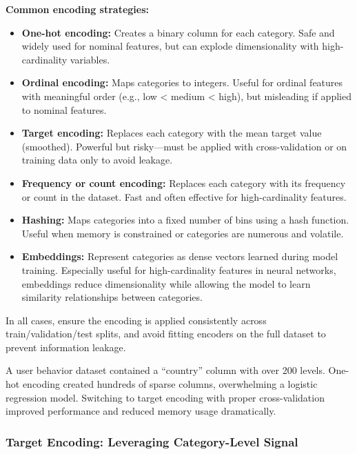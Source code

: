 \documentclass[12pt,openany, draft]{book}
\begin{document}
\textbf{Common encoding strategies:}
\begin{itemize}
    \item \textbf{One-hot encoding:} Creates a binary column for each category. Safe and widely used for nominal features, but can explode dimensionality with high-cardinality variables.
    \item \textbf{Ordinal encoding:} Maps categories to integers. Useful for ordinal features with meaningful order (e.g., low < medium < high), but misleading if applied to nominal features.
    \item \textbf{Target encoding:} Replaces each category with the mean target value (smoothed). Powerful but risky—must be applied with cross-validation or on training data only to avoid leakage.
    \item \textbf{Frequency or count encoding:} Replaces each category with its frequency or count in the dataset. Fast and often effective for high-cardinality features.
    \item \textbf{Hashing:} Maps categories into a fixed number of bins using a hash function. Useful when memory is constrained or categories are numerous and volatile.
    \item \textbf{Embeddings:} Represent categories as dense vectors learned during model training. Especially useful for high-cardinality features in neural networks, embeddings reduce dimensionality while allowing the model to learn similarity relationships between categories.
\end{itemize}

In all cases, ensure the encoding is applied consistently across train/validation/test splits, and avoid fitting encoders on the full dataset to prevent information leakage. \newline

\begin{examplebox}
A user behavior dataset contained a “country” column with over 200 levels. One-hot encoding created hundreds of sparse columns, overwhelming a logistic regression model. Switching to target encoding with proper cross-validation improved performance and reduced memory usage dramatically.
\end{examplebox}



\subsubsection{Target Encoding: Leveraging Category-Level Signal}
\end{document}
